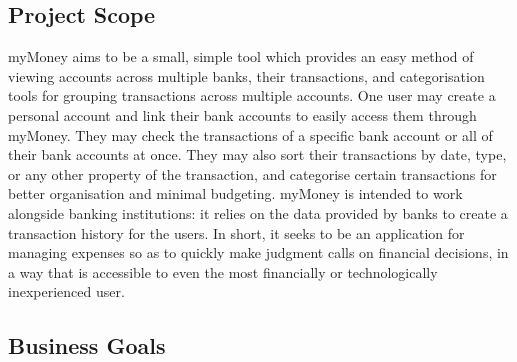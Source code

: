 \documentclass[11pt]{article}
\newcounter{use case ID}
\begin{document}
\subsection{Project Scope}
myMoney aims to be a small, simple tool which provides an easy method of viewing accounts across multiple banks, their transactions, and categorisation tools for grouping transactions across multiple accounts. One user may create a personal account and link their bank accounts to easily access them through myMoney. They may check the transactions of a specific bank account or all of their bank accounts at once. They may also sort their transactions by date, type, or any other property of the transaction, and categorise certain transactions for better organisation and minimal budgeting. myMoney is intended to work alongside banking institutions: it relies on the data provided by banks to create a transaction history for the users. In short, it seeks to be an application for managing expenses so as to quickly make judgment calls on financial decisions, in a way that is accessible to even the most financially or technologically inexperienced user.

\clearpage

\subsection{Business Goals}
\end{document}
